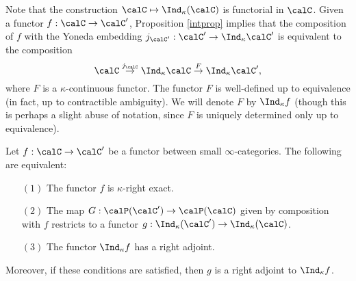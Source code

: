 Note that the construction $\calC \mapsto \Ind_{\kappa}(\calC)$ is functorial in $\calC$.
Given a functor $f: \calC \rightarrow \calC'$, Proposition \ref{intprop} implies that the composition of $f$ with the Yoneda embedding $j_{\calC'}: \calC' \rightarrow \Ind_{\kappa} \calC'$ is equivalent to the composition $$ \calC \stackrel{j_{\calC}}{\rightarrow} \Ind_{\kappa} \calC \stackrel{F}{\rightarrow}\Ind_{\kappa} \calC',$$
where $F$ is a $\kappa$-continuous functor. The functor $F$ is well-defined up to equivalence (in fact, up to contractible ambiguity). We will denote $F$ by $\Ind_{\kappa} f$ (though this is perhaps a slight abuse of notation, since $F$ is uniquely determined only up to equivalence).

\begin{proposition}
Let $f: \calC \rightarrow \calC'$ be a functor between small $\infty$-categories. The following
are equivalent:
\begin{itemize}
\item[$(1)$] The functor $f$ is $\kappa$-right exact.
\item[$(2)$] The map $G: \calP(\calC') \rightarrow \calP(\calC)$ given by composition with $f$ restricts to a functor $g: \Ind_{\kappa}(\calC') \rightarrow \Ind_{\kappa}(\calC)$.
\item[$(3)$] The functor $\Ind_{\kappa} f$ has a right adjoint.
\end{itemize}
Moreover, if these conditions are satisfied, then $g$ is a right adjoint to $\Ind_{\kappa} f$.
\end{proposition}

